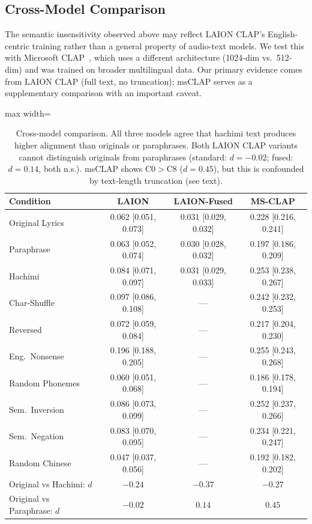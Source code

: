 \documentclass[11pt]{article}
\begin{document}
\subsection{Cross-Model Comparison}\label{sec:crossmodel}

The semantic insensitivity observed above may reflect LAION CLAP's English-centric training rather than a general property of audio-text models. We test this with Microsoft CLAP~\citep{elizalde2024msclap}, which uses a different architecture (1024-dim vs.\ 512-dim) and was trained on broader multilingual data. Our primary evidence comes from LAION CLAP (full text, no truncation); msCLAP serves as a supplementary comparison with an important caveat.

\begin{table}[!t]
\centering
\caption{Cross-model comparison. All three models agree that hachimi text produces higher alignment than originals or paraphrases. Both LAION CLAP variants cannot distinguish originals from paraphrases (standard: $d{=}{-}0.02$; fused: $d{=}0.14$, both n.s.). msCLAP shows C0${>}$C8 ($d{=}0.45$), but this is confounded by text-length truncation (see text).}
\label{tab:crossmodel}
\scriptsize
\begin{adjustbox}{max width=\columnwidth}
\begin{tabular}{l ccc}
\toprule
\textbf{Condition} & \textbf{LAION} & \textbf{LAION-Fused} & \textbf{MS-CLAP} \\
\midrule
Original Lyrics & 0.062 [0.051, 0.073] & 0.031 [0.029, 0.032] & 0.228 [0.216, 0.241] \\
Paraphrase      & 0.063 [0.052, 0.074] & 0.030 [0.028, 0.032] & 0.197 [0.186, 0.209] \\
Hachimi            & 0.084 [0.071, 0.097] & 0.031 [0.029, 0.033] & 0.253 [0.238, 0.267] \\
Char-Shuffle       & 0.097 [0.086, 0.108] & --- & 0.242 [0.232, 0.253] \\
Reversed           & 0.072 [0.059, 0.084] & --- & 0.217 [0.204, 0.230] \\
Eng.\ Nonsense    & 0.196 [0.188, 0.205] & --- & 0.255 [0.243, 0.268] \\
Random Phonemes    & 0.060 [0.051, 0.068] & --- & 0.186 [0.178, 0.194] \\
Sem.\ Inversion    & 0.086 [0.073, 0.099] & --- & 0.252 [0.237, 0.266] \\
Sem.\ Negation     & 0.083 [0.070, 0.095] & --- & 0.234 [0.221, 0.247] \\
Random Chinese     & 0.047 [0.037, 0.056] & --- & 0.192 [0.182, 0.202] \\
\midrule
Original vs Hachimi: $d$ & $-0.24$ & $-0.37$ & $-0.27$ \\
Original vs Paraphrase: $d$ & $-0.02$ & $0.14$ & $0.45$ \\
\bottomrule
\end{tabular}
\end{adjustbox}
\end{table}
\end{document}
